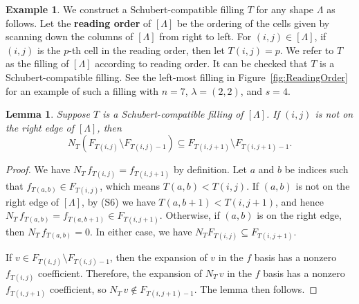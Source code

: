 \documentclass[11pt]{amsart}
\newtheorem{lemma}[theorem]{Lemma}     %
\theoremstyle{definition}
\newtheorem{example}[theorem]{Example}
\begin{document}
\begin{example}\label{ex:ReadingOrder}
We construct a Schubert-compatible filling $T$ for any shape $\Lambda$ as follows. 
Let the \textbf{reading order} of $[\Lambda]$ be the ordering of the cells given by scanning down the columns of $[\Lambda]$ from right to left. For $(i,j)\in [\Lambda]$, if $(i,j)$ is the $p$-th cell in the reading order, then let $T(i,j)=p$. We refer to $T$ as the filling of $[\Lambda]$ according to reading order. It can be checked that $T$ is a Schubert-compatible filling. See the left-most filling in Figure~\ref{fig:ReadingOrder} for an example of such a filling with $n=7$, $\lambda = (2,2)$, and $s=4$.
\end{example}

\begin{lemma}\label{lem:S6}
Suppose $T$ is a Schubert-compatible filling of $[\Lambda]$. If $(i,j)$ is not on the right edge of $[\Lambda]$, then 
\begin{equation}
N_T (F_{T(i,j)}\setminus F_{T(i,j)-1}) \subseteq F_{T(i,j+1)}\setminus F_{T(i,j+1)-1}.
\end{equation}
\end{lemma}

\begin{proof}
We have $N_T \, f_{T(i,j)} = f_{T(i,j+1)}$ by definition. Let $a$ and $b$ be indices such that $f_{T(a,b)}\in F_{T(i,j)}$, which means $T(a,b) < T(i,j)$. If $(a,b)$ is not on the right edge of $[\Lambda]$, by (S6) we have $T(a,b+1) < T(i,j+1)$, and hence $N_T\, f_{T(a,b)} = f_{T(a,b+1)}\in F_{T(i,j+1)}$. Otherwise, if $(a,b)$ is on the right edge, then $N_T\, f_{T(a,b)} = 0$. In either case, we have $N_T F_{T(i,j)} \subseteq F_{T(i,j+1)}$. 

If $v\in F_{T(i,j)}\setminus F_{T(i,j)-1}$, then the expansion of $v$ in the $f$ basis has a nonzero $f_{T(i,j)}$ coefficient. Therefore, the expansion of $N_T\, v$ in the $f$ basis has a nonzero $f_{T(i,j+1)}$ coefficient, so $N_T\, v\notin F_{T(i,j+1)-1}$. The lemma then follows.
\end{proof}
\end{document}

